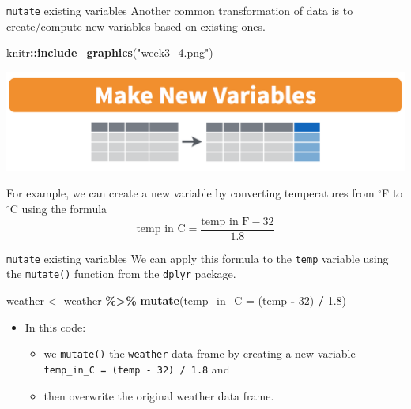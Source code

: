 \documentclass[
  ignorenonframetext,
]{beamer}
\newenvironment{Shaded}{\begin{snugshade}}{\end{snugshade}}
\newcommand{\AttributeTok}[1]{\textcolor[rgb]{0.13,0.29,0.53}{#1}}
\newcommand{\DecValTok}[1]{\textcolor[rgb]{0.00,0.00,0.81}{#1}}
\newcommand{\FloatTok}[1]{\textcolor[rgb]{0.00,0.00,0.81}{#1}}
\newcommand{\FunctionTok}[1]{\textcolor[rgb]{0.13,0.29,0.53}{\textbf{#1}}}
\newcommand{\NormalTok}[1]{#1}
\newcommand{\OtherTok}[1]{\textcolor[rgb]{0.56,0.35,0.01}{#1}}
\newcommand{\SpecialCharTok}[1]{\textcolor[rgb]{0.81,0.36,0.00}{\textbf{#1}}}
\newcommand{\StringTok}[1]{\textcolor[rgb]{0.31,0.60,0.02}{#1}}
\providecommand{\tightlist}{%
  \setlength{\itemsep}{0pt}\setlength{\parskip}{0pt}}
\begin{document}
\begin{frame}[fragile]{\texttt{mutate} existing variables}
\protect\hypertarget{mutate-existing-variables}{}
Another common transformation of data is to create/compute new variables
based on existing ones.

\begin{Shaded}
\begin{Highlighting}[]
\NormalTok{knitr}\SpecialCharTok{::}\FunctionTok{include\_graphics}\NormalTok{(}\StringTok{"week3\_4.png"}\NormalTok{)}
\end{Highlighting}
\end{Shaded}

\begin{center}\includegraphics[width=0.8\linewidth,height=0.4\textheight]{week3_4} \end{center}

For example, we can create a new variable by converting temperatures
from \(^\circ\)F to \(^\circ\)C using the formula
\[\text{temp in C}=\frac{\text{temp in F}-32}{1.8}\]
\end{frame}

\begin{frame}[fragile]{\texttt{mutate} existing variables}
\protect\hypertarget{mutate-existing-variables-1}{}
We can apply this formula to the \texttt{temp} variable using the
\texttt{mutate()} function from the \texttt{dplyr} package.

\tiny

\begin{Shaded}
\begin{Highlighting}[]
\NormalTok{weather }\OtherTok{\textless{}{-}}\NormalTok{ weather }\SpecialCharTok{\%\textgreater{}\%} 
  \FunctionTok{mutate}\NormalTok{(}\AttributeTok{temp\_in\_C =}\NormalTok{ (temp }\SpecialCharTok{{-}} \DecValTok{32}\NormalTok{) }\SpecialCharTok{/} \FloatTok{1.8}\NormalTok{)}
\end{Highlighting}
\end{Shaded}

\normalsize

\begin{itemize}
\item
  In this code:

  \begin{itemize}
  \tightlist
  \item
    we \texttt{mutate()} the \texttt{weather} data frame by creating a
    new variable \texttt{temp\_in\_C\ =\ (temp\ -\ 32)\ /\ 1.8} and
  \item
    then overwrite the original weather data frame.
  \end{itemize}
\end{itemize}
\end{frame}
\end{document}
